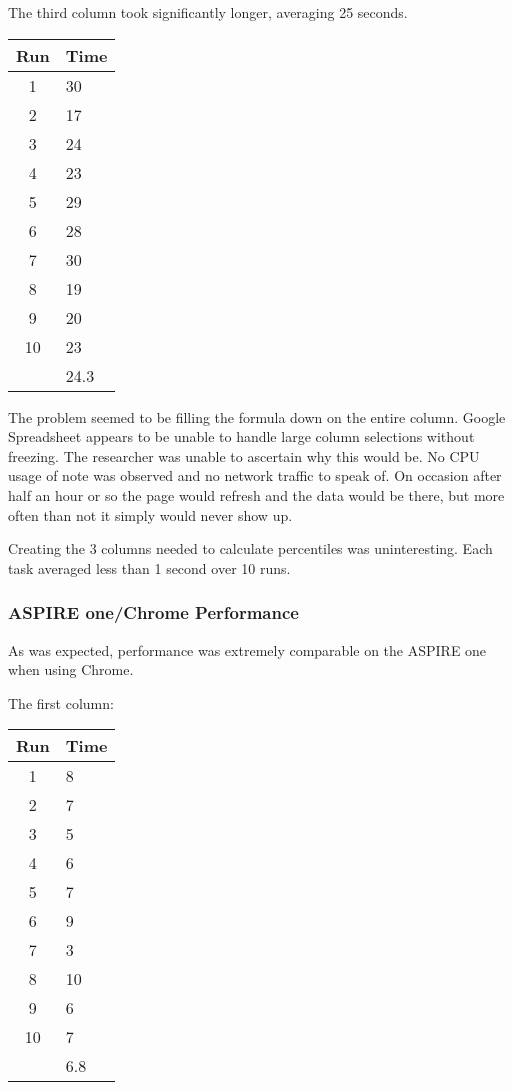 \documentclass[12pt,oneside,letterpaper,titlepage]{article}
\begin{document}
The third column took significantly longer, averaging 25 seconds.

\begin{tabular}{| c | l |}
  \hline
  Run  & Time \\ \hline
  1    & 30   \\ \hline
  2    & 17   \\ \hline
  3    & 24   \\ \hline
  4    & 23   \\ \hline
  5    & 29   \\ \hline
  6    & 28   \\ \hline
  7    & 30   \\ \hline
  8    & 19   \\ \hline
  9    & 20   \\ \hline
  10   & 23   \\ \hline
       & 24.3 \\
  \hline
\end{tabular}

The problem seemed to be filling the formula down on the entire column.  Google
Spreadsheet appears to be unable to handle large column selections without
freezing.  The researcher was unable to ascertain why this would be.  No CPU
usage of note was observed and no network traffic to speak of.  On occasion
after half an hour or so the page would refresh and the data would be there, but
more often than not it simply would never show up.

Creating the 3 columns needed to calculate percentiles was uninteresting.  Each
task averaged less than 1 second over 10 runs.

\subsubsection{ASPIRE one/Chrome Performance}

As was expected, performance was extremely comparable on the ASPIRE one when
using Chrome.

The first column:

\begin{tabular}{| c | l |}
  \hline
  Run  & Time \\ \hline
  1    & 8    \\ \hline
  2    & 7    \\ \hline
  3    & 5    \\ \hline
  4    & 6    \\ \hline
  5    & 7    \\ \hline
  6    & 9    \\ \hline
  7    & 3    \\ \hline
  8    & 10   \\ \hline
  9    & 6    \\ \hline
  10   & 7    \\ \hline
       & 6.8  \\
  \hline
\end{tabular}
\end{document}
